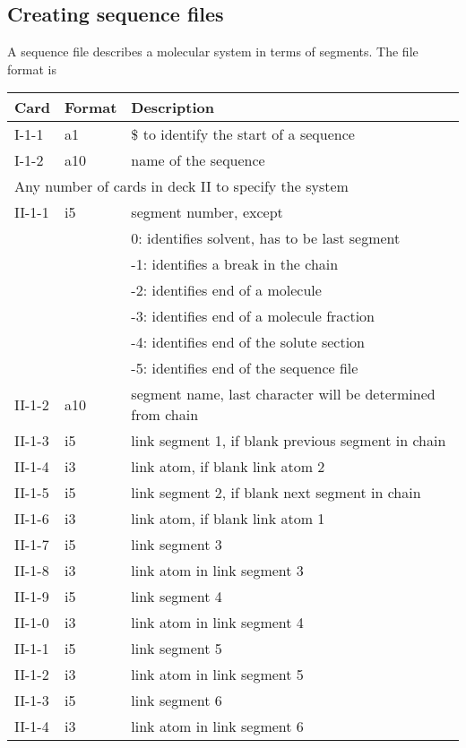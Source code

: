 \subsection{Creating sequence files}
A sequence file describes a molecular system in terms of segments. The
file format is
\begin{center}
\begin{tabular*}{150mm}{p{12mm}p{12mm}l}
\hline\hline
Card & Format & Description \\ \hline
I-1-1  & a1     & \$ to identify the start of a sequence \\ %
I-1-2  & a10    & name of the sequence\\
\multicolumn{3}{l}{Any number of cards in deck II to specify the system} \\
II-1-1 & i5     & segment number, except\\
       &        &  0: identifies solvent, has to be last segment\\
       &        & -1: identifies a break in the chain\\
       &        & -2: identifies end of a molecule\\
       &        & -3: identifies end of a molecule fraction\\
       &        & -4: identifies end of the solute section\\
       &        & -5: identifies end of the sequence file\\
II-1-2 & a10    & segment name, last character will be determined from chain\\
II-1-3 & i5     & link segment 1, if blank previous segment in chain\\
II-1-4 & i3     & link atom, if blank link atom 2\\
II-1-5 & i5     & link segment 2, if blank next segment in chain\\
II-1-6 & i3     & link atom, if blank link atom 1\\
II-1-7 & i5     & link segment 3\\
II-1-8 & i3     & link atom in link segment 3\\
II-1-9 & i5     & link segment 4\\
II-1-0 & i3     & link atom in link segment 4\\
II-1-1 & i5     & link segment 5\\
II-1-2 & i3     & link atom in link segment 5\\
II-1-3 & i5     & link segment 6\\
II-1-4 & i3     & link atom in link segment 6\\

\end{tabular*}
\end{center}
